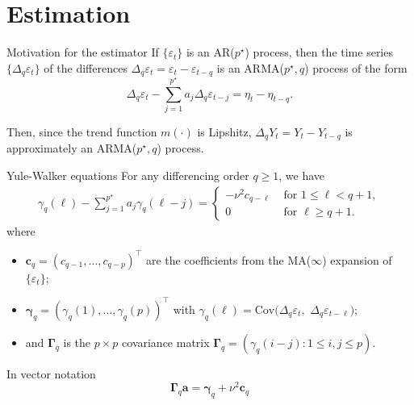 \documentclass[10pt]{beamer}
\newcommand{\Cov}{\mathrm{Cov}}
\begin{document}
\section{Estimation}

\begin{frame}{Motivation for the estimator}
If $\{\varepsilon_t\}$ is an AR($p^\star$) process, then the time series $\{ \Delta_q \varepsilon_t \}$ of the differences $\Delta_q \varepsilon_t = \varepsilon_t - \varepsilon_{t-q}$ is an ARMA($p^\star,q$) process of the form 
\begin{equation*}
\Delta_q \varepsilon_t - \sum_{j=1}^{p^\star} a_j \Delta_q \varepsilon_{t-j} = \eta_t - \eta_{t-q}. 
\end{equation*}\pause

Then, since the trend function $m(\cdot)$ is Lipshitz, $\Delta_q Y_{t} = Y_{t} - Y_{t-q}$ is approximately an ARMA($p^\star,q$) process.
\end{frame} 


\begin{frame}{Yule-Walker equations}
For any differencing order $q \geq 1$, we have
\vspace{-3mm}
\begin{align*}
	\gamma_q(\ell) - \sum_{j=1}^{p^\star} a_j \gamma_q(\ell - j) = \begin{cases}
	-\nu^2 c_{q - \ell} &\text{ for } 1\leq \ell < q+1,\\
	0 &\text{ for } \ell \geq q+1.
	\end{cases}
\end{align*}
where
\vspace{-3mm}
\begin{itemize}
	\item $\boldsymbol{c}_q = (c_{q-1},\dots,c_{q-p})^\top$ are the coefficients from the MA($\infty$) expansion of $\{ \varepsilon_t \}$;
	\item $\boldsymbol{\gamma}_q = (\gamma_q(1),\dots,\gamma_q(p))^\top$ with $\gamma_q(\ell) = \Cov(\Delta_q \varepsilon_t,$ $\Delta_q \varepsilon_{t-\ell})$;
	\item and $\boldsymbol{\Gamma}_q$ is the $p \times p$ covariance matrix $\boldsymbol{\Gamma}_q = (\gamma_q(i-j): 1 \le i,j \le p)$.
\end{itemize}\pause
\begin{block}{In vector notation}
\begin{equation*}\label{YU-eq}
\boldsymbol{\Gamma}_q \boldsymbol{a} = \boldsymbol{\gamma}_q + \nu^2 \boldsymbol{c}_q  
\end{equation*}
\end{block}
\end{frame}
\end{document}

